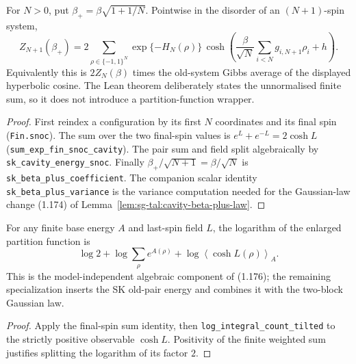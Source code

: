 \begin{theorem}
\label{thm:sg-tal:cavity-free-energy-split}
  \leanok
{}
For $N>0$, put $\beta_+=\beta\sqrt{1+1/N}$.  Pointwise in the disorder of an
$(N+1)$-spin system,
\[
 Z_{N+1}(\beta_+)=2\sum_{\rho\in\{-1,1\}^N}
 \exp\{-H_N(\rho)\}\,
 \cosh\!\left(\frac\beta{\sqrt N}\sum_{i<N}g_{i,N+1}\rho_i+h\right).
\]
Equivalently this is $2Z_N(\beta)$ times the old-system Gibbs average of the displayed
hyperbolic cosine.  The Lean theorem deliberately states the unnormalised finite sum, so it
does not introduce a partition-function wrapper.
\end{theorem}
\begin{proof}
  \leanok
First reindex a configuration by its first $N$ coordinates and its final spin
(\texttt{Fin.snoc}).  The sum over the two final-spin values is
$e^L+e^{-L}=2\cosh L$ (\texttt{sum\_exp\_fin\_snoc\_cavity}).  The pair sum and field split
algebraically by \texttt{sk\_cavity\_energy\_snoc}.  Finally
$\beta_+/\sqrt{N+1}=\beta/\sqrt N$ is \texttt{sk\_beta\_plus\_coefficient}.
The companion scalar identity \texttt{sk\_beta\_plus\_variance} is the variance computation
needed for the Gaussian-law change (1.174) of Lemma~\ref{lem:sg-tal:cavity-beta-plus-law}.
\end{proof}

\begin{lemma}
\label{lem:sg-tal:cavity-log-factorization}
  \leanok
{}
For any finite base energy $A$ and last-spin field $L$, the logarithm of the enlarged
partition function is
\[
 \log 2+\log\sum_\rho e^{A(\rho)}+
 \log\left\langle\cosh L(\rho)\right\rangle_A.
\]
This is the model-independent algebraic component of (1.176); the remaining specialization
inserts the SK old-pair energy and combines it with the two-block Gaussian law.
\end{lemma}
\begin{proof}
  \leanok
Apply the final-spin sum identity, then \texttt{log\_integral\_count\_tilted} to the strictly
positive observable $\cosh L$.  Positivity of the finite weighted sum justifies splitting the
logarithm of its factor $2$.
\end{proof}

